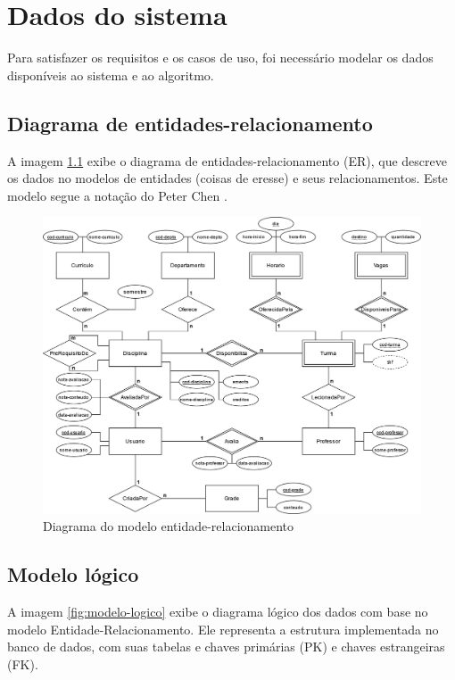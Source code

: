 \chapter{Dados do sistema}
\label{cha:Dados do sistema}

Para satisfazer os requisitos e os casos de uso, foi necessário modelar os dados disponíveis ao sistema e ao algoritmo.

\section{Diagrama de entidades-relacionamento}

A imagem \ref{fig:diagrama-classes} exibe o diagrama de entidades-relacionamento (ER), que descreve os dados no modelos de entidades (coisas de eresse) e seus relacionamentos. Este modelo segue a notação do Peter Chen \cite{peter-chen}. 

\begin{figure}[ht]
    \begin{center}
    \includegraphics[width=390pt]{figuras/diagrama-er-chen.png}
    \caption{Diagrama do modelo entidade-relacionamento}
    \label{fig:diagrama-classes}
    \end{center}
\end{figure}

\section{Modelo lógico}

A imagem \ref{fig:modelo-logico} exibe o diagrama lógico dos dados com base no modelo Entidade-Relacionamento. Ele representa a estrutura implementada no banco de dados, com suas tabelas e chaves primárias (PK) e chaves estrangeiras (FK).


